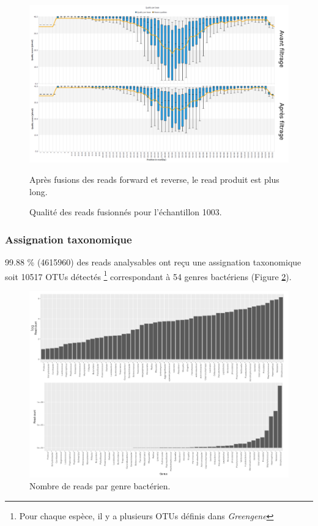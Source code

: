 \documentclass[12pt,a4paper]{article}
\begin{document}
\begin{figure}[h]
\begin{center}
\includegraphics[scale=0.45]{img/duo_merging.png}\hfill
\end{center}
\caption{Qualité des reads fusionnés pour l'échantillon 1003.}
Après fusions des reads forward et reverse, le read produit est plus long.
\label{fastqt_after}
\end{figure}


\subsubsection{Assignation taxonomique}
99.88 \% (4615960) des reads analysables ont reçu une assignation taxonomique soit 10517 OTUs détectés \footnote{Pour chaque espèce, il y a plusieurs OTUs définis dans \textit{Greengene}} correspondant à 54 genres bactériens (Figure \ref{readgenus}).


\begin{figure}[h]
\begin{center}
\includegraphics[scale=0.7]{img/read_count_genus_all.png}\hfill
\end{center}
\caption{Nombre de reads par genre bactérien.}
\label{readgenus}
\end{figure}
\end{document}
